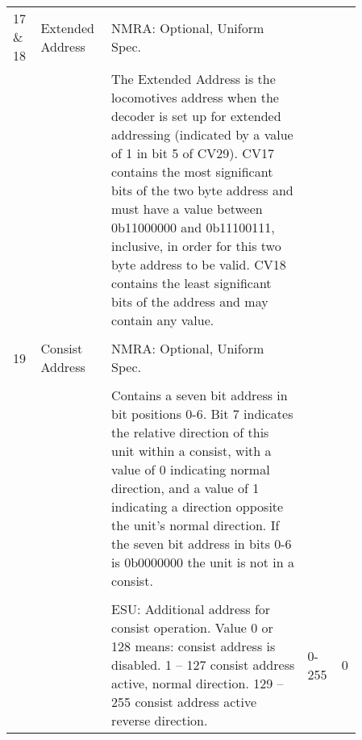 \begin{tabular}{p{0.075\linewidth} p{0.15\linewidth} p{0.525\linewidth} p{0.06\linewidth} p{0.05\linewidth}}
\\
17 \& 18 & Extended Address & NMRA: Optional, Uniform Spec.\\
& & The Extended Address is the locomotives address when the decoder is set up for extended addressing (indicated by a value of 1 in bit  5 of CV29). CV17 contains the most significant bits of the two byte address and must have a value between 0b11000000 and 0b11100111, inclusive, in order for this two byte address to be valid. CV18 contains the least significant bits of the address and may contain any value.\\
\\
19 & Consist Address & NMRA: Optional, Uniform Spec.\\
\\
& & Contains a seven bit address in bit positions 0-6. Bit 7 indicates the relative direction of this unit within a consist, with a value of 0 indicating normal direction, and a value of 1 indicating a direction opposite the unit's normal direction. If the seven bit address in bits 0-6 is 0b0000000 the unit is not in a consist.\\
\\
& & ESU: Additional address for consist operation. Value 0 or 128 means: consist address is disabled. 1 – 127 consist address active, normal direction. 129 – 255 consist address active reverse direction. & 0-255 & 0\\
\end{tabular}
\newpage
